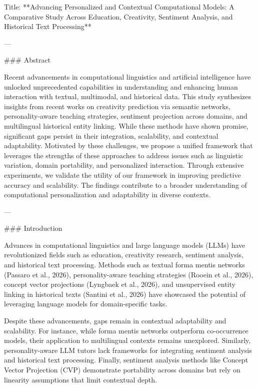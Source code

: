 Title: **Advancing Personalized and Contextual Computational Models: A Comparative Study Across Education, Creativity, Sentiment Analysis, and Historical Text Processing**

---

### Abstract

Recent advancements in computational linguistics and artificial intelligence have unlocked unprecedented capabilities in understanding and enhancing human interaction with textual, multimodal, and historical data. This study synthesizes insights from recent works on creativity prediction via semantic networks, personality-aware teaching strategies, sentiment projection across domains, and multilingual historical entity linking. While these methods have shown promise, significant gaps persist in their integration, scalability, and contextual adaptability. Motivated by these challenges, we propose a unified framework that leverages the strengths of these approaches to address issues such as linguistic variation, domain portability, and personalized interaction. Through extensive experiments, we validate the utility of our framework in improving predictive accuracy and scalability. The findings contribute to a broader understanding of computational personalization and adaptability in diverse contexts.

---

### Introduction

Advances in computational linguistics and large language models (LLMs) have revolutionized fields such as education, creativity research, sentiment analysis, and historical text processing. Methods such as textual forma mentis networks (Passaro et al., 2026), personality-aware teaching strategies (Rooein et al., 2026), concept vector projections (Lyngbaek et al., 2026), and unsupervised entity linking in historical texts (Santini et al., 2026) have showcased the potential of leveraging language models for domain-specific tasks.

Despite these advancements, gaps remain in contextual adaptability and scalability. For instance, while forma mentis networks outperform co-occurrence models, their application to multilingual contexts remains unexplored. Similarly, personality-aware LLM tutors lack frameworks for integrating sentiment analysis and historical text processing. Finally, sentiment analysis methods like Concept Vector Projection (CVP) demonstrate portability across domains but rely on linearity assumptions that limit contextual depth.

